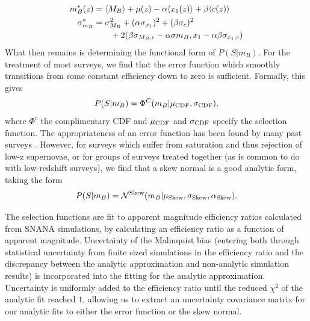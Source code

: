 \documentclass[a4paper,fleqn,usenatbib]{mnras}
\begin{document}
\begin{align}
m_B^*(z) &= \langle M_B \rangle + \mu(z) - \alpha \langle x_1(z) \rangle + \beta \langle c(z) \rangle \\
\sigma^*_{m_B} &= \sigma_{M_B}^2 + (\alpha \sigma_{x_1})^2 + (\beta \sigma_c)^2 \notag\\ 
&\quad\quad + 2(\beta \sigma_{M_B,c} - \alpha \sigma{m_B,x_1} - \alpha \beta \sigma_{x_1,c})
\end{align}
What then remains is determining the functional form of $P(S|m_B)$. For the treatment of most surveys, we find that the error function which smoothly transitions from some constant efficiency down to zero is sufficient. Formally, this gives
\begin{align}
P(S|m_B) = \Phi^C(m_B | \mu_{\rm CDF}, \sigma_{\rm CDF}),
\end{align}
where $\Phi^c$ the complimentary CDF and $\mu_{\rm CDF}$ and $\sigma_{\rm CDF}$ specify the selection function. The appropriateness of an error function has been found by many past surveys \citep{Dilday2008, Barbary2010, Perrett2012, Graur2013, Rodney2014}. However, for surveys which suffer from saturation and thus rejection of low-z supernovae, or for groups of surveys treated together (as is common to do with low-redshift surveys), we find that a skew normal is a good analytic form, taking the form
\begin{align}
P(S|m_B) = \mathcal{N}^{{\rm Skew}}(m_B | \mu_{\rm Skew}, \sigma_{\rm Skew}, \alpha_{\rm Skew}).
\end{align}

The selection functions are fit to apparent magnitude efficiency ratios calculated from SNANA simulations, by calculating an efficiency ratio as a function of apparent magnitude. Uncertainty of the Malmquist bias (entering both through statistical uncertainty from finite sized simulations in the efficiency ratio and the discrepancy between the analytic approximation and non-analytic simulation results) is incorporated into the fitting for the analytic approximation. Uncertainty is uniformly added to the efficiency ratio until the reduced $\chi^2$ of the analytic fit reached $1$, allowing us to extract an uncertainty covariance matrix for our analytic fits to either the error function or the skew normal.
\end{document}
